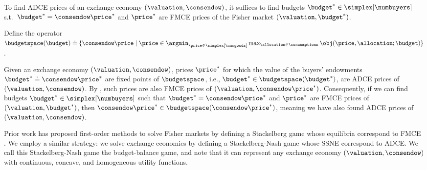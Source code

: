 
\begin{corollary}
\label{cor:ad_fixed_point}
To find ADCE prices of an exchange economy $(\valuation, \consendow)$, it suffices to find budgets $\budget^* \in \simplex[\numbuyers]$ s.t.\ $\budget^* = \consendow \price^*$ and $\price^*$ are FMCE prices of the Fisher market $(\valuation, \budget^*)$.
\end{corollary}


Define the operator $\budgetspace (\budget) \doteq \{\consendow \price \mid \price \in \argmin_{\price \in \simplex[\numgoods]} \max_{\allocation \in \consumptions} \obj (\price, \allocation; \budget) \}$.

Given an exchange economy $(\valuation, \consendow)$, prices $\price^*$ for which the value of the buyers' endowments $\budget^* \doteq \consendow \price^*$ are fixed points of $\budgetspace$, i.e., $\budget^* \in \budgetspace (\budget^*)$, are ADCE prices of $(\valuation, \consendow)$.
By , such prices are also FMCE prices of $(\valuation, \consendow \price^*)$.
Consequently, if we can find budgets $\budget^* \in \simplex[\numbuyers]$ such that $\budget^* = \consendow \price^*$ and $\price^*$ are FMCE prices of $(\valuation, \budget^*)$, then $\consendow \price^* \in \budgetspace (\consendow \price^*)$, meaning we have also found ADCE prices of $(\valuation, \consendow)$.

\fi


Prior work has proposed first-order methods to solve Fisher markets by defining a Stackelberg game whose equilibria correspond to FMCE \cite{goktas2021minmax}.
We employ a similar strategy: we solve exchange economies by defining a Stackelberg-Nash game whose SSNE correspond to ADCE.
We call this Stackelberg-Nash game the budget-balance game, and note that it can represent any exchange economy $(\valuation, \consendow)$ with continuous, concave, and homogeneous utility functions.

